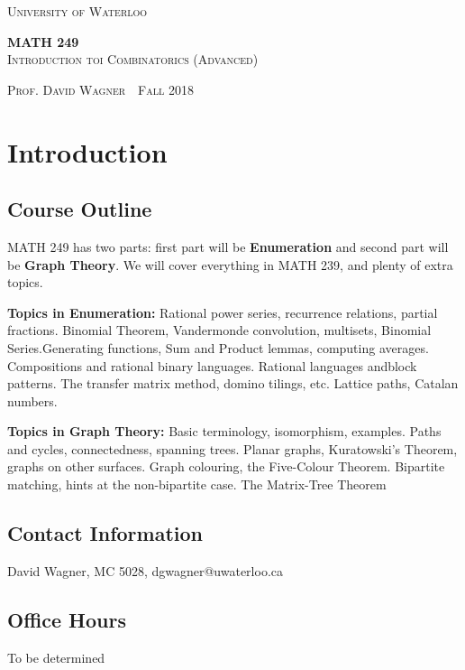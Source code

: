 \documentclass[11pt]{article}
\newcommand{\thiscoursecode}{MATH 249}
\newcommand{\thiscoursename}{Introduction toi Combinatorics (Advanced)}
\newcommand{\thisprof}{David Wagner}
\newcommand{\thisterm}{Fall 2018}
\begin{document}
\begin{titlepage}
    \begin{centering}
        {\scshape\LARGE University of Waterloo \par}
        \globe
        {\huge\bf \thiscoursecode}\\
        {\scshape\Large \thiscoursename}\\
        \vspace{.3cm}
        {\scshape Prof. \thisprof~\textbullet~\thisterm\par}
    \end{centering}
\sectionline
\tableofcontents
\sectionline
\thispagestyle{empty}

\pagebreak
\section{Introduction}
\subsection{Course Outline}
MATH 249 has two parts: first part will be {\bf Enumeration} and second part
will be {\bf Graph Theory}. We will cover everything in MATH 239, and plenty of
extra
topics.

{\bf Topics in Enumeration:} Rational power series, recurrence relations,
partial fractions. Binomial Theorem, Vandermonde convolution, multisets,
Binomial Series.Generating functions, Sum and Product lemmas, computing
averages. Compositions and rational binary languages. Rational languages
andblock patterns. The transfer matrix method, domino tilings, etc. Lattice
paths, Catalan numbers.

{\bf Topics in Graph Theory:} Basic terminology, isomorphism, examples. Paths
and cycles, connectedness, spanning trees. Planar graphs, Kuratowski’s Theorem,
graphs on other surfaces. Graph colouring, the Five-Colour Theorem.
Bipartite matching, hints at the non-bipartite case. The Matrix-Tree Theorem

\subsection{Contact Information}
David Wagner, MC 5028, dgwagner@uwaterloo.ca

\subsection{Office Hours}
To be determined


\end{titlepage}
\end{document}
